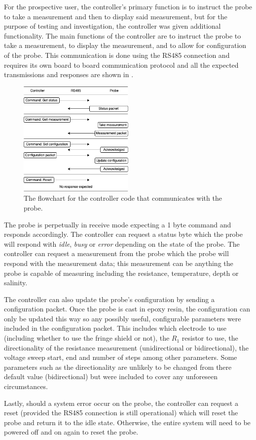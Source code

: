 For the prospective user, the controller's primary function is to instruct the probe to take a measurement and then to display said measurement, but for the purpose of testing and investigation, the controller was given additional functionality.
The main functions of the controller are to instruct the probe to take a measurement, to display the measurement, and to allow for configuration of the probe.
This communication is done using the RS485 connection and requires its own board to board communication protocol and all the expected transmissions and responses are shown in .

\begin{figure}[h]
    \centering
    \includegraphics[width=0.5\textwidth]{Figures/rs485_flowchart}
    \caption{The flowchart for the controller code that communicates with the probe.}
    \label{fig:rs485-flowchart} %
\end{figure}

The probe is perpetually in receive mode expecting a 1 byte command and responds accordingly.
The controller can request a status byte which the probe will respond with \textit{idle}, \textit{busy} or \textit{error} depending on the state of the probe.
The controller can request a measurement from the probe which the probe will respond with the measurement data; this measurement can be anything the probe is capable of measuring including the resistance, temperature, depth or salinity.

The controller can also update the probe's configuration by sending a configuration packet.
Once the probe is cast in epoxy resin, the configuration can only be updated this way so any possibly useful, configurable parameters were included in the configuration packet.
This includes which electrode to use (including whether to use the fringe shield or not), the $R_1$ resistor to use, the directionality of the resistance measurement (unidirectional or bidirectional), the voltage sweep start, end and number of steps among other parameters.
Some parameters such as the directionality are unlikely to be changed from there default value (bidirectional) but were included to cover any unforeseen circumstances.

Lastly, should a system error occur on the probe, the controller can request a reset (provided the RS485 connection is still operational) which will reset the probe and return it to the idle state.
Otherwise, the entire system will need to be powered off and on again to reset the probe.
